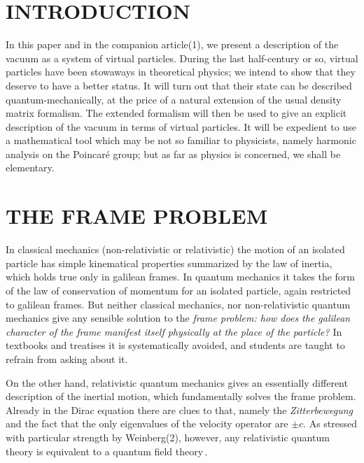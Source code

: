 \documentclass[a4paper,11pt]{article}
\begin{document}

\newpage

\section{INTRODUCTION}

In this paper and in the companion article(1), we present a description of the vacuum as a 
system of virtual particles. During the last half-century or so, virtual particles have been 
stowaways in theoretical physics; we intend to show that they deserve to have a better status. 
It will turn out that their state can be described quantum-mechanically, at the price of a 
natural extension of the usual density matrix formalism. The extended formalism will then be 
used to give an explicit description of the vacuum in terms of virtual particles. It will be 
expedient to use a mathematical tool which may be not so familiar to physicists, namely 
harmonic analysis on the Poincar\'e  group; but as far as physics is concerned, we shall be 
elementary.

\section{THE FRAME PROBLEM}

In classical mechanics (non-relativistic or relativistic) the motion of an isolated particle 
has simple kinematical properties summarized by the law of inertia, which holds true only in 
galilean frames. In quantum mechanics it takes the form of the law of conservation of momentum 
for an isolated particle, again restricted to galilean frames. But neither classical mechanics, 
nor non-relativistic quantum mechanics give any sensible solution to the {\it frame problem: 
how does the galilean character of the frame manifest itself physically at the place of the 
particle?} In textbooks and treatises it is systematically avoided, and students are taught to 
refrain from asking about it.

 On the other hand, relativistic quantum mechanics gives an essentially 
different description of the inertial motion, which fundamentally solves the frame problem. 
Already in the Dirac equation there are clues to that, namely the {\it Zitterbewegung} and the 
fact 
that the only eigenvalues of the velocity operator are $\pm c$. As stressed with particular 
strength by Weinberg(2), however, any relativistic quantum theory is equivalent to a quantum 
field theory\,\footnotemark[3].
\end{document}
